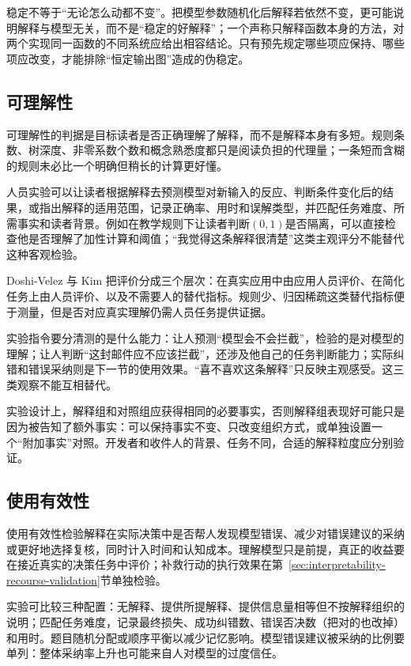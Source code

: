 稳定不等于“无论怎么动都不变”。把模型参数随机化后解释若依然不变，更可能说明解释与模型无关，而不是“稳定的好解释”；一个声称只解释函数本身的方法，对两个实现同一函数的不同系统应给出相容结论。只有预先规定哪些项应保持、哪些项应改变，才能排除“恒定输出图”造成的伪稳定。

\subsection{可理解性}
\label{sec:interpretability-quality-comprehensibility}

可理解性的判据是目标读者是否正确理解了解释，而不是解释本身有多短。规则条数、树深度、非零系数个数和概念熟悉度都只是阅读负担的代理量；一条短而含糊的规则未必比一个明确但稍长的计算更好懂。

人员实验可以让读者根据解释去预测模型对新输入的反应、判断条件变化后的结果，或指出解释的适用范围，记录正确率、用时和误解类型，并匹配任务难度、所需事实和读者背景。例如在教学规则下让读者判断$(0,1)$是否隔离，可以直接检查他是否理解了加性计算和阈值；“我觉得这条解释很清楚”这类主观评分不能替代这种客观检验。

Doshi-Velez 与 Kim 把评价分成三个层次：在真实应用中由应用人员评价、在简化任务上由人员评价、以及不需要人的替代指标。规则少、归因稀疏这类替代指标便于测量，但是否对应真实理解仍需人员任务提供证据。

实验指令要分清测的是什么能力：让人预测“模型会不会拦截”，检验的是对模型的理解；让人判断“这封邮件应不应该拦截”，还涉及他自己的任务判断能力；实际纠错和错误采纳则是下一节的使用效果。“喜不喜欢这条解释”只反映主观感受。这三类观察不能互相替代。

实验设计上，解释组和对照组应获得相同的必要事实，否则解释组表现好可能只是因为被告知了额外事实：可以保持事实不变、只改变组织方式，或单独设置一个“附加事实”对照。开发者和收件人的背景、任务不同，合适的解释粒度应分别验证。

\subsection{使用有效性}
\label{sec:interpretability-quality-utility}

使用有效性检验解释在实际决策中是否帮人发现模型错误、减少对错误建议的采纳或更好地选择复核，同时计入时间和认知成本。理解模型只是前提，真正的收益要在接近真实的决策任务中评价；补救行动的执行效果在第~\ref{sec:interpretability-recourse-validation}节单独检验。

实验可比较三种配置：无解释、提供所提解释、提供信息量相等但不按解释组织的说明；匹配任务难度，记录最终损失、成功纠错数、错误否决数（把对的也改掉）和用时。题目随机分配或顺序平衡以减少记忆影响。模型错误建议被采纳的比例要单列：整体采纳率上升也可能来自人对模型的过度信任。

